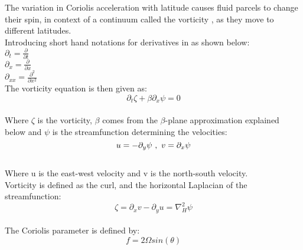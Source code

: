 The variation in Coriolis acceleration with latitude causes fluid parcels to change their spin, in context of a continuum called the vorticity \cite{vorticity}, as they move to different latitudes.\\

Introducing short hand notations for derivatives in as shown below:\\

$\partial_t = \frac{\partial}{\partial t}$\\

$\partial_x = \frac{\partial}{\partial x}$\\

$\partial_{xx} = \frac{\partial^2}{\partial x^2}$\\

The vorticity equation is then given as:\\ 

\begin{equation}
\partial_t\zeta + \beta\partial_x\psi = 0
\end{equation}\\

Where $\zeta$ is the vorticity, $\beta$ comes from the $\beta$-plane approximation explained below and $\psi$ is the streamfunction determining the velocities:\\

\begin{equation}
u = -\partial_y\psi  \\\   ,  \\\  v = \partial_x\psi
\end{equation}\\

Where u is the east-west velocity and v is the north-south velocity.\\

Vorticity is defined as the curl, and the horizontal Laplacian of the streamfunction:\\

\begin{equation}
\zeta = \partial_xv - \partial_yu = \nabla^2_H\psi
\end{equation}\\

The Coriolis parameter is defined by:\\

\begin{equation}
f = 2\Omega sin(\theta)
\end{equation}\\

